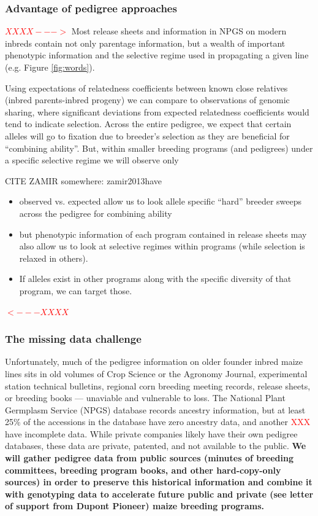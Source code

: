 \documentclass[12pt]{article}
\begin{document}
\subsubsection*{Advantage of pedigree approaches}
\textcolor{red}{$XXXX--->$}
Most release sheets and information in NPGS on modern inbreds contain not only parentage information, but a wealth of important phenotypic information and the selective regime used in propagating a given line (e.g. Figure \ref{fig:words}). 

Using expectations of relatedness coefficients between known close relatives (inbred parents-inbred progeny) we can compare to observations of genomic sharing, where significant deviations from expected relatedness coefficients would tend to indicate selection. 
Across the entire pedigree, we expect that certain alleles will go to fixation due to breeder's selection as they are beneficial for ``combining ability''. 
But, within smaller breeding programs (and pedigrees) under a specific selective regime we will observe only 

CITE ZAMIR somewhere: zamir2013have

\begin{itemize}
\item observed vs. expected allow us to look allele specific ``hard'' breeder sweeps across the pedigree for combining ability
\item but phenotypic information of each program contained in release sheets may also allow us to look at selective regimes within programs (while selection is relaxed in others).
\item If alleles exist in other programs along with the specific diversity of that program, we can target those.
\end{itemize}
\textcolor{red}{$<---XXXX$}

\subsubsection*{The missing data challenge}

Unfortunately, much of the pedigree information on older founder inbred maize lines sits in old volumes of Crop Science or the Agronomy Journal, experimental station technical bulletins, regional corn breeding meeting records, release sheets, or breeding books --- unaviable and vulnerable to loss.  
The National Plant Germplasm Service (NPGS) database records ancestry information, but at least 25\% of the accessions in the database have zero ancestry data, and another \textcolor{red}{XXX} have incomplete data. 
While private companies likely have their own pedigree databases, these data are private, patented, and not available to the public. 
\textbf{We will gather pedigree data from public sources (minutes of breeding committees, breeding program books, and other hard-copy-only sources) in order to preserve this historical information and combine it with genotyping data to accelerate future public and private (see letter of support from Dupont Pioneer) maize breeding programs.}
\end{document}
